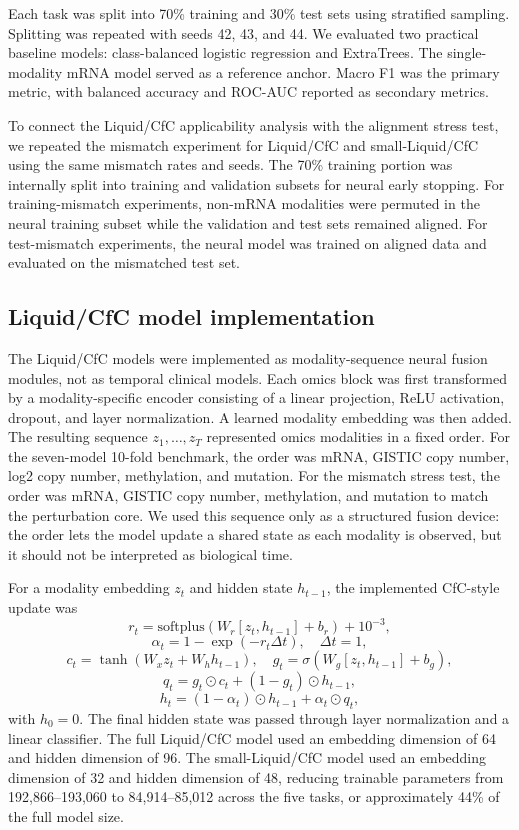 Each task was split into 70\% training and 30\% test sets using stratified sampling. Splitting was repeated with seeds 42, 43, and 44. We evaluated two practical baseline models: class-balanced logistic regression and ExtraTrees. The single-modality mRNA model served as a reference anchor. Macro F1 was the primary metric, with balanced accuracy and ROC-AUC reported as secondary metrics.

To connect the Liquid/CfC applicability analysis with the alignment stress test, we repeated the mismatch experiment for Liquid/CfC and small-Liquid/CfC using the same mismatch rates and seeds. The 70\% training portion was internally split into training and validation subsets for neural early stopping. For training-mismatch experiments, non-mRNA modalities were permuted in the neural training subset while the validation and test sets remained aligned. For test-mismatch experiments, the neural model was trained on aligned data and evaluated on the mismatched test set.

\subsection{Liquid/CfC model implementation}

The Liquid/CfC models were implemented as modality-sequence neural fusion modules, not as temporal clinical models. Each omics block was first transformed by a modality-specific encoder consisting of a linear projection, ReLU activation, dropout, and layer normalization. A learned modality embedding was then added. The resulting sequence \(z_1,\ldots,z_T\) represented omics modalities in a fixed order. For the seven-model 10-fold benchmark, the order was mRNA, GISTIC copy number, log2 copy number, methylation, and mutation. For the mismatch stress test, the order was mRNA, GISTIC copy number, methylation, and mutation to match the perturbation core. We used this sequence only as a structured fusion device: the order lets the model update a shared state as each modality is observed, but it should not be interpreted as biological time.

For a modality embedding \(z_t\) and hidden state \(h_{t-1}\), the implemented CfC-style update was
\[
r_t=\mathrm{softplus}\left(W_r[z_t,h_{t-1}]+b_r\right)+10^{-3},
\]
\[
\alpha_t=1-\exp(-r_t\Delta t), \quad \Delta t=1,
\]
\[
c_t=\tanh(W_x z_t+W_h h_{t-1}), \quad
g_t=\sigma(W_g[z_t,h_{t-1}]+b_g),
\]
\[
q_t=g_t\odot c_t+(1-g_t)\odot h_{t-1},
\]
\[
h_t=(1-\alpha_t)\odot h_{t-1}+\alpha_t\odot q_t,
\]
with \(h_0=0\). The final hidden state was passed through layer normalization and a linear classifier. The full Liquid/CfC model used an embedding dimension of 64 and hidden dimension of 96. The small-Liquid/CfC model used an embedding dimension of 32 and hidden dimension of 48, reducing trainable parameters from 192,866--193,060 to 84,914--85,012 across the five tasks, or approximately 44\% of the full model size.

